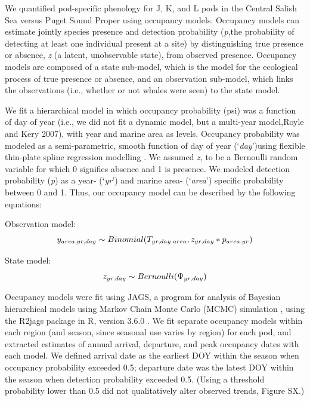 \documentclass{article}
\begin{document}
\par We quantified pod-specific phenology for J, K, and L pods in the Central Salish Sea versus Puget Sound Proper using occupancy models. Occupancy models can estimate jointly species presence and detection probability (\emph{p},the probability of detecting at least one individual present at a site) by distinguishing true presence or absence, \emph{z} (a latent, unobservable state), from observed presence. Occupancy models are composed of a state sub-model, which is the model for the ecological process of true presence or absence, and  an observation sub-model, which links the observations (i.e., whether or not whales were seen) to the state model.
\par We fit a hierarchical model in which occupancy probability (psi) was a function of day of year (i.e., we did not fit a dynamic model, but a multi-year model,Royle and Kery 2007), with year and marine area as levels. Occupancy probability was modeled as a semi-parametric, smooth function of day of year (`\emph{day}')using flexible thin-plate spline regression modelling \citep{strebel2014}. We assumed \emph{z}, to be a Bernoulli random variable for which 0 signifies absence and 1 is presence. We modeled detection probability (\emph{p}) as a year- (`\emph{yr}') and marine area- (`\emph{area}') specific probability between 0 and 1. Thus, our occupancy model can be described by the following equations:

\par Observation model:
\begin{equation} 
y_{area,yr,day} \sim Binomial (T_{yr,day,area}, z_{yr,day} * p_{area,yr})\\
\end{equation}

\par State model:
\begin{equation} 
z_{yr,day} \sim Bernoulli (\mathrm{\Psi}_{yr,day})\\
\end{equation}

\par Occupancy models were fit using JAGS, a program for analysis of Bayesian hierarchical models using Markov Chain Monte Carlo (MCMC) simulation \citep{plummer2019}, using the R2jags package \citep{su2015} in R, version 3.6.0 \citep{r2019}. We fit separate occupancy models within each region (and season, since seasonal use varies by region) for each pod, and extracted estimates of annual arrival, departure, and peak occupancy dates with each model. We defined arrival date as the earliest DOY within the season when occupancy probability exceeded 0.5; departure date was the latest DOY within the season when detection probability exceeded 0.5. (Using a threshold probability lower than 0.5 did not qualitatively alter observed trends, Figure SX.)
\end{document}
